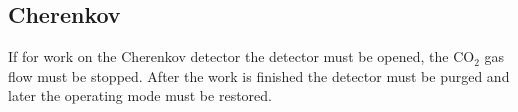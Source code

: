 \begin{safetyen}{0}{0}
\subsection{Cherenkov}

If for work on the Cherenkov detector the detector must be opened, 
the CO$_2$ gas flow must be stopped. After the work is finished the 
detector must be purged and later the operating mode must be restored.

\end{safetyen}



%
%
%
%
%
%
%
%
